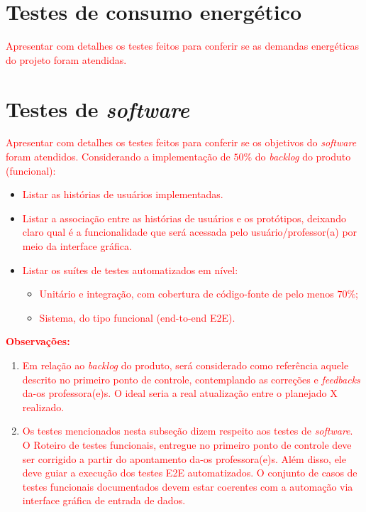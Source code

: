 \section{Testes de consumo energético}

\textcolor{red}{Apresentar com detalhes os testes feitos para conferir se as demandas energéticas do projeto foram atendidas.}

\section{Testes de \textit{software}}

\textcolor{red}{Apresentar com detalhes os testes feitos para conferir se os objetivos do \textit{software} foram atendidos.
Considerando a implementação de $50\%$ do \textit{backlog} do produto (funcional):}

\begin{itemize}
    \item \textcolor{red}{Listar as histórias de usuários implementadas.}
    \item \textcolor{red}{Listar a associação entre as histórias de usuários e os protótipos, deixando claro qual é a funcionalidade que será acessada pelo usuário/professor(a) por meio da interface gráfica.}
    \item \textcolor{red}{Listar os suítes de testes automatizados em nível:}
    \begin{itemize}
        \item \textcolor{red}{Unitário e integração, com cobertura de código-fonte de pelo menos $70\%$;}
        \item \textcolor{red}{Sistema, do tipo funcional (end-to-end E2E).}
    \end{itemize}
\end{itemize}

\textcolor{red}{\textbf{Observações:}}
\begin{enumerate}
    \item \textcolor{red}{Em relação ao \textit{backlog} do produto, será considerado como referência aquele descrito no primeiro ponto de controle, contemplando as correções e \textit{feedbacks} da-os professora(e)s. O ideal seria a real atualização entre o planejado X realizado.}
    \item \textcolor{red}{Os testes mencionados nesta subseção dizem respeito aos testes de \textit{software}. O Roteiro de testes funcionais, entregue no primeiro ponto de controle deve ser corrigido a partir do apontamento da-os professora(e)s. Além disso, ele deve guiar a execução dos testes E2E automatizados. O conjunto de casos de testes funcionais documentados devem estar coerentes com a automação via interface gráfica de entrada de dados.}
\end{enumerate}

